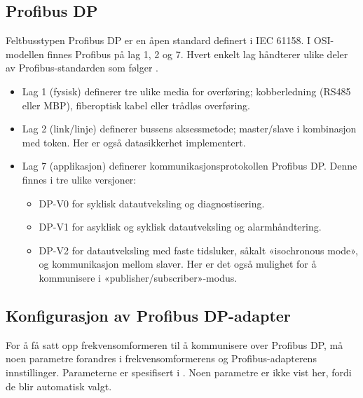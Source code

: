 \documentclass[Visionprosjekt.tex]{subfiles}
\begin{document}
\subsection{Profibus DP}

Feltbusstypen Profibus DP er en åpen standard definert i IEC 61158. I OSI-modellen finnes  Profibus på lag 1, 2 og 7. Hvert enkelt lag håndterer ulike deler av Profibus-standarden som følger \cite{ProfiStort,Skeienotat}.

\begin{itemize}
     \item Lag 1 (fysisk) definerer tre ulike media for overføring; kobberledning (RS485 eller MBP),  fiberoptisk kabel eller trådløs overføring. 
     \item Lag 2 (link/linje) definerer bussens aksessmetode; master/slave i kombinasjon med token. Her er også datasikkerhet implementert. 
     \item Lag 7 (applikasjon) definerer kommunikasjonsprotokollen Profibus DP. Denne finnes i tre ulike versjoner:
         \begin{itemize}
             \item DP-V0 for syklisk datautveksling og diagnostisering.
             \item DP-V1 for asyklisk og syklisk datautveksling og  alarmhåndtering.
             \item DP-V2 for datautveksling med faste tidsluker, såkalt «isochronous mode», og kommunikasjon mellom slaver. Her er det også mulighet for å kommunisere i «publisher/subscriber»-modus.
         \end{itemize}
\end{itemize}





\subsection{Konfigurasjon av Profibus DP-adapter}

For å få satt opp frekvensomformeren til å kommunisere over Profibus DP, må noen parametre forandres i frekvensomformerens og Profibus-adapterens innstillinger. Parameterne er spesifisert i . Noen parametre er ikke vist her, fordi de blir automatisk valgt. \cite{profibusadapter}
\end{document}
